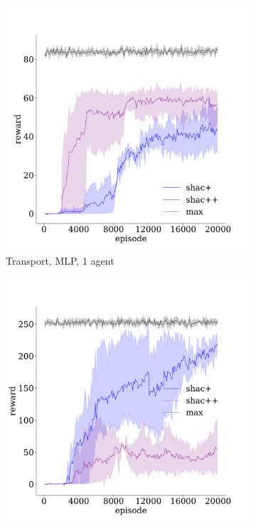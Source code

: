 \begin{figure}[!t]
    \begin{subfigure}[b]{0.32\textwidth}
        \includegraphics[width=\textwidth]{figs/transport-ablation-1-mlp.pdf}
        \caption{Transport, MLP, 1 agent}
        \label{fig:transport-ablation-mlp-1}
    \end{subfigure}
    \begin{subfigure}[b]{0.32\textwidth}
        \includegraphics[width=\textwidth]{figs/transport-ablation-3-mlp.pdf}

\end{subfigure}
\end{figure}
